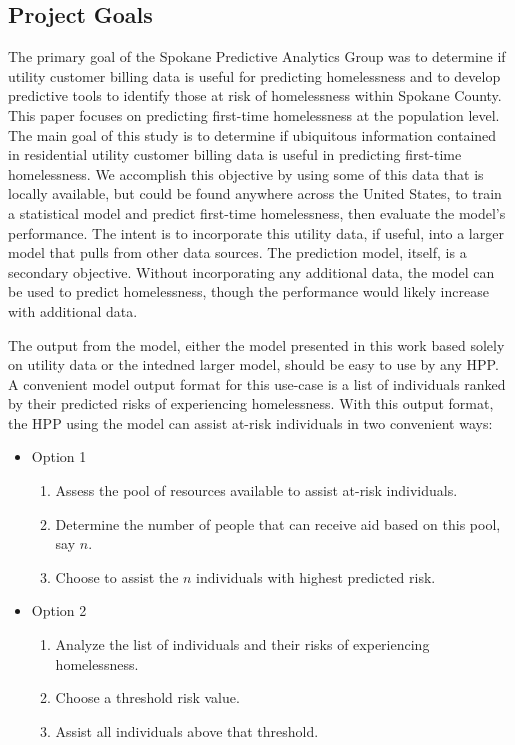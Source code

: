 \documentclass[10pt,letterpaper]{article}
\begin{document}
\subsection*{Project Goals}
The primary goal of the Spokane Predictive Analytics Group was to determine if utility customer billing data is useful for predicting homelessness and to develop predictive tools to identify those at risk of homelessness within Spokane County. This paper focuses on predicting first-time homelessness at the population level. The main goal of this study is to determine if ubiquitous information contained in residential utility customer billing data is useful in predicting first-time homelessness. We accomplish this objective by using some of this data that is locally available, but could be found anywhere across the United States, to train a statistical model and predict first-time homelessness, then evaluate the model's performance. The intent is to incorporate this utility data, if useful, into a larger model that pulls from other data sources. The prediction model, itself, is a secondary objective. Without incorporating any additional data, the model can be used to predict homelessness, though the performance would likely increase with additional data.

The output from the model, either the model presented in this work based solely on utility data or the intedned larger model, should be easy to use by any HPP. A convenient model output format for this use-case is a list of individuals ranked by their predicted risks of experiencing homelessness. With this output format, the HPP using the model can assist at-risk individuals in two convenient ways:

\begin{itemize}
    \item Option 1
    \begin{enumerate}
        \item Assess the pool of resources available to assist at-risk individuals.
        \item Determine the number of people that can receive aid based on this pool, say $n$.
        \item Choose to assist the $n$ individuals with highest predicted risk.
    \end{enumerate}
    \item Option 2
    \begin{enumerate}
        \item Analyze the list of individuals and their risks of experiencing homelessness.
        \item Choose a threshold risk value.
        \item Assist all individuals above that threshold.
    \end{enumerate}
\end{itemize}
\end{document}
